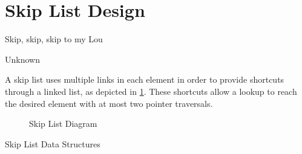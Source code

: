 \section{Skip List Design}
\label{sec:skiplist:Skip List Design}
%
\epigraph{Skip, skip, skip to my Lou}
	 {Unknown}

A skip list uses multiple links in each element in order to
provide shortcuts through a linked list, as depicted in
\cref{fig:datastruct:Skip List Diagram}.
These shortcuts allow a lookup to reach the desired element with
at most two pointer traversals.

\begin{figure}
\centering
{}
\caption{Skip List Diagram}
\label{fig:datastruct:Skip List Diagram}
\end{figure}

\QuickQuizEnd

\begin{listing}

\caption{Skip List Data Structures}
\label{lst:datastruct:Skip List Data Structures}
\end{listing}

